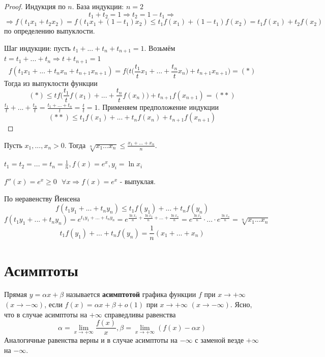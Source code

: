     \begin{proof}
    	Индукция по $n$. База индукции: $n = 2$
    	\[ t_1 + t_2 = 1 \Rightarrow t_2 = 1 - t_1 \Rightarrow \]
    	\[ \Rightarrow f(t_1 x_1 + t_2 x_2) = f(t_1 x_1 + (1 - t_1) x_2) \leqslant t_1 f(x_1) + (1 - t_1) f(x_2) = t_1 f(x_1) + t_2 f(x_2) \]
    	по определению выпуклости.
    	
    	Шаг индукции: пусть $t_1 + ... + t_n + t_{n + 1} = 1$. Возьмём $t = t_1 + ... + t_n \Rightarrow t + t_{n + 1} = 1$
    	\[ f(t_1 x_1 + ... + t_n x_n + t_{n + 1} x_{n + 1}) = f\bigg(t\bigg(\frac{t_1}{t} x_1 + ... + \frac{t_n}{t} x_n\bigg) + t_{n + 1} x_{n + 1}\bigg) = (*) \]
    	Тогда из выпуклости функции
    	\[ (*) \leqslant t f\bigg(\frac{t_1}{t} f(x_1) + ... + \frac{t_n}{t} f(x_n)\bigg) + t_{n + 1} f(x_{n + 1}) = (**)  \]
    	$\frac{t_1}{t} + ... + \frac{t_n}{t} = \frac{t_1 + ... + t_n}{t} = \frac{t}{t} = 1$. Применяем предположение индукции
    	\[ (**) \leqslant t_1 f(x_1) + ... + t_n f(x_n) + t_{n + 1} f(x_{n + 1}) \]
    \end{proof}
    
    \begin{example}
    	Пусть $x_1, ..., x_n > 0$. Тогда $\sqrt[n]{x_1 ... x_n} \leqslant \frac{x_1 + ... + x_n}{n}$.
    \end{example}
    
    $t_1 = t_2 = ... = t_n = \frac{1}{n}, f(x) = e^x, y_i = \ln{x_i}$
    
    $f''(x) = e^x \geqslant 0 \text{ } \forall x \Rightarrow f(x) = e^x$ - выпуклая.
    
    По неравенству Йенсена
    \[ f(t_1 y_1 + ... + t_n y_n) \leqslant t_1 f(y_1) + ... + t_n f(y_n) \]
    \[ f(t_1 y_1 + ... + t_n y_n) = e^{t_1 y_1 + ... + t_n y_n} = e^{\frac{\ln{x_1}}{n} + \frac{\ln{x_2}}{n} + ... + \frac{\ln{x_n}}{n}} = e^{\frac{\ln{x_1}}{n}} \cdot ... \cdot e^{\frac{\ln{x_n}}{n}} = \sqrt[n]{x_1 ... x_n} \]
    \[ t_1 f(y_1) + ... + t_n f(y_n) = \frac{1}{n} (x_1 + ... + x_n) \]
    
    \section{Асимптоты}
    
    \begin{definition}
    	Прямая $y = \alpha x + \beta$ называется \textbf{асимптотой} графика функции
    	$f$ при $x \to +\infty$ $(x \to -\infty)$, если $f(x) = \alpha x + \beta + o(1)$ при
    	$x \to +\infty$ $(x \to -\infty)$. Ясно, что в случае асимптоты на $+\infty$
    	справедливы равенства
    	\[ \alpha = \lim_{x \to +\infty} \frac{f(x)}{x}, \beta = \lim_{x \to +\infty} (f(x) - \alpha x) \]
    	Аналогичные равенства верны и в случае асимптоты на $-\infty$ с
    	заменой везде $+\infty$ на $-\infty$.
    \end{definition}
	
